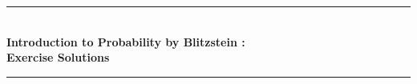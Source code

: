 \documentclass[a4paper, 11pt]{book}
\theoremstyle{plain}
\begin{document}
\begin{titlepage}
\newcommand{\HRule}{\rule{\linewidth}{0.5mm}}
\center
\HRule \\[0.4cm]
{ \huge \bfseries Introduction to Probability by Blitzstein :\\ Exercise Solutions\\[0.15cm] }
\HRule \\[1.5cm]
\end{titlepage}

\begingroup
\let\cleardoublepage\clearpage
\tableofcontents
\endgroup


\end{document}
